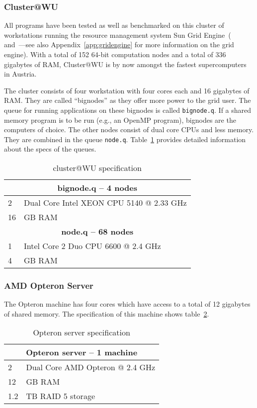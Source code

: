 \subsubsection{Cluster@WU}
All programs
have been tested as well as benchmarked on this cluster of
workstations running the resource management system Sun Grid 
Engine~(\cite{gentzsch02sge} and~\cite{sge07}---see also
Appendix~\ref{app:gridengine} for more information on the 
grid engine). With a total of 152 64-bit computation nodes and a total
of 336 gigabytes of RAM, Cluster@WU is by now amongst the fastest
supercomputers in Austria.

The cluster consists of four workstation with four cores each and 16
gigabytes of RAM. They are called ``bignodes'' as they offer more
power to the grid user. The queue for running applications on these
bignodes is called \texttt{bignode.q}. If a shared memory program is
to be run (e.g., an OpenMP program), bignodes are the computers of choice.
The other nodes consist of dual core CPUs and less
memory. They are combined in the queue
\texttt{node.q}. Table~\ref{tab:clusterWU} provides detailed
information about the specs of the queues.

\begin{table}[h!b!p!]
\caption{cluster@WU specification}
\centering
\label{tab:clusterWU}
\begin{tabular}{|l|l|}
\hline
\multicolumn{2}{|c|}{\textbf{bignode.q -- 4 nodes}}\\
\hline
2  & Dual Core Intel XEON CPU 5140 @ 2.33 GHz\\
16 & GB RAM\\
\hline
\multicolumn{2}{|c|}{\textbf{node.q -- 68 nodes}}\\
\hline
1 & Intel Core 2 Duo CPU 6600 @ 2.4 GHz\\
4 & GB RAM\\
\hline
\end{tabular}
\end{table}

\subsubsection{AMD Opteron Server}
The Opteron machine has four cores which
have access to a total of 12 gigabytes of shared memory. The
specification of this machine shows table~\ref{tab:opteronserver}.

\begin{table}[h!b!p!]
\centering
\caption{Opteron server specification}
\label{tab:opteronserver}
\begin{tabular}{|l|l|}
\hline
\multicolumn{2}{|c|}{\textbf{Opteron server -- 1 machine}}\\
\hline
2  & Dual Core AMD Opteron @ 2.4 GHz\\
12 & GB RAM\\
1.2& TB RAID 5 storage\\
\hline
\end{tabular}
\end{table}

